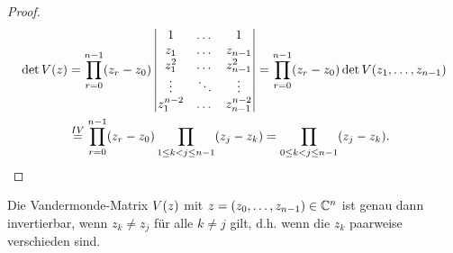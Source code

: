 \begin{proof}
    \[
        \begin{split}
            \det{V \! \left( z \right)}
            &= \prod_{r=0}^{n-1} (z_r - z_0) \begin{vmatrix}
                1         & \dots & 1 \\
                z_1       & \dots & z_{n-1} \\
                z_1^2     & \dots & z_{n-1}^2 \\
                \vdots    & \ddots & \vdots \\
                z_1^{n-2} & \dots & z_{n-1}^{n-2}
            \end{vmatrix}
            = \prod_{r=0}^{n-1} (z_r - z_0) \det{V \! \left( z_1, \dots, z_{n-1} \right)}\\
            &\overset{IV}{=}
                \prod_{r=0}^{n-1} (z_r - z_0) \prod_{1 \leq k < j \leq n-1} (z_j - z_k)
            = \prod_{0 \leq k < j \leq n-1} (z_j - z_k).
        \end{split}
    \]
\end{proof}

\begin{corollary}
    \label{cor:invertability_vandermonde_matrix}
    Die Vandermonde-Matrix $V \! \left( z \right)$ mit
    $z = (z_0, \dots, z_{n-1}) \in \mathbb{C}^n$ ist genau dann invertierbar, wenn
    $z_k \neq z_j$ für alle $k \neq j$ gilt, d.h. wenn die $z_k$ paarweise
    verschieden sind.
\end{corollary}

